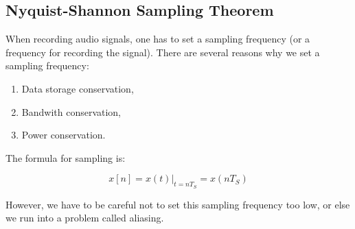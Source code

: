 \subsection{Nyquist-Shannon Sampling Theorem}
When recording audio signals, one has to set a sampling frequency (or a frequency for recording the signal). There are several reasons why we set a sampling frequency:
\begin{enumerate}
	\item Data storage conservation,
	\item Bandwith conservation,
	\item Power conservation.
\end{enumerate}

The formula for sampling is:

\begin{equation}
x[n]=x(t)|_{t=nT_{S}}=x(nT_{S})
\end{equation}

However, we have to be careful not to set this sampling frequency too low, or else we run into a problem called aliasing. 